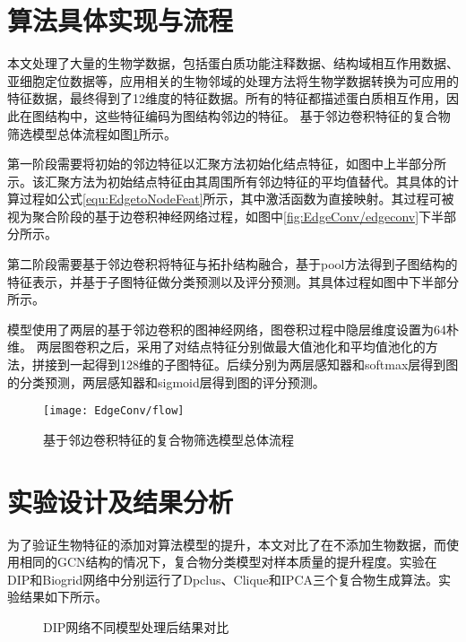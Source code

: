 \section{算法具体实现与流程}
\label{section:EdgeConv:flow}
本文处理了大量的生物学数据，包括蛋白质功能注释数据、结构域相互作用数据、亚细胞定位数据等，应用相关的生物邻域的处理方法将生物学数据转换为可应用的特征数据，最终得到了12维度的特征数据。所有的特征都描述蛋白质相互作用，因此在图结构中，这些特征编码为图结构邻边的特征。
基于邻边卷积特征的复合物筛选模型总体流程如图\ref{fig:EdgeConv/flow}所示。

第一阶段需要将初始的邻边特征以汇聚方法初始化结点特征，如图中上半部分所示。该汇聚方法为初始结点特征由其周围所有邻边特征的平均值替代。其具体的计算过程如公式\ref{equ:EdgetoNodeFeat}所示，其中激活函数为直接映射。其过程可被视为聚合阶段的基于边卷积神经网络过程，如图中\ref{fig:EdgeConv/edgeconv}下半部分所示。

第二阶段需要基于邻边卷积将特征与拓扑结构融合，基于pool方法得到子图结构的特征表示，并基于子图特征做分类预测以及评分预测。其具体过程如图中下半部分所示。

模型使用了两层的基于邻边卷积的图神经网络，图卷积过程中隐层维度设置为64朴维。
两层图卷积之后，采用了对结点特征分别做最大值池化和平均值池化的方法，拼接到一起得到128维的子图特征。后续分别为两层感知器和softmax层得到图的分类预测，两层感知器和sigmoid层得到图的评分预测。


\begin{figure}[htbp]
    \centering
    \texttt{[image: EdgeConv/flow]}
    \caption{基于邻边卷积特征的复合物筛选模型总体流程}
    \label{fig:EdgeConv/flow}
\end{figure}

\section{实验设计及结果分析}
\label{section:EdgeConv:experience}

为了验证生物特征的添加对算法模型的提升，本文对比了在不添加生物数据，而使用相同的GCN结构的情况下，复合物分类模型对样本质量的提升程度。实验在DIP和Biogrid网络中分别运行了Dpclus、Clique和IPCA三个复合物生成算法。实验结果如下所示。
\begin{figure}[htbp]
    \centering
    \vskip0.2cm
    \caption{DIP网络不同模型处理后结果对比}
    \label{fig:result/DIP/edge}
\end{figure}

